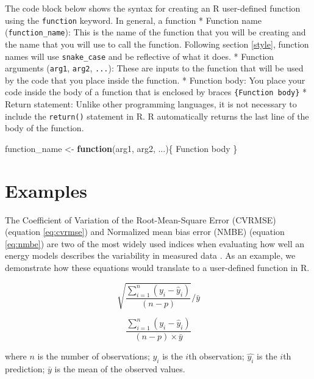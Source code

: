 \documentclass[
]{book}
\newenvironment{Shaded}{\begin{snugshade}}{\end{snugshade}}
\newcommand{\ControlFlowTok}[1]{\textcolor[rgb]{0.13,0.29,0.53}{\textbf{#1}}}
\newcommand{\NormalTok}[1]{#1}
\newcommand{\OtherTok}[1]{\textcolor[rgb]{0.56,0.35,0.01}{#1}}
\begin{document}
The code block below shows the syntax for creating an R user-defined function using the \texttt{function} keyword. In general, a function
* Function name (\texttt{function\_name}): This is the name of the function that you will be creating and the name that you will use to call the function. Following section \ref{style}, function names will use \texttt{snake\_case} and be reflective of what it does.
* Function arguments (\texttt{arg1}, \texttt{arg2}, \texttt{...}): These are inputs to the function that will be used by the code that you place inside the function.
* Function body: You place your code inside the body of a function that is enclosed by braces \texttt{\{Function\ body\}}
* Return statement: Unlike other programming languages, it is not necessary to include the \texttt{return()} statement in R. R automatically returns the last line of the body of the function.

\begin{Shaded}
\begin{Highlighting}[]
\NormalTok{function\_name }\OtherTok{\textless{}{-}} \ControlFlowTok{function}\NormalTok{(arg1, arg2, ...)\{}
\NormalTok{  Function body}
\NormalTok{\}}
\end{Highlighting}
\end{Shaded}

\hypertarget{examples}{%
\section{Examples}\label{examples}}

The Coefficient of Variation of the Root-Mean-Square Error (CVRMSE) (equation \eqref{eq:cvrmse}) and Normalized mean bias error (NMBE) (equation \eqref{eq:nmbe}) are two of the most widely used indices when evaluating how well an energy models describes the variability in measured data \citep{ashrae_ashrae_2014}. As an example, we demonstrate how these equations would translate to a user-defined function in R.

\begin{equation} 
  \sqrt{\frac{\sum_{i=1}^{n} \left(y_i - \hat{y}_i\right)}{(n-p)}} \Big/ \bar{y}
  \label{eq:cvrmse}
\end{equation}

\begin{equation} 
  \frac{\sum_{i=1}^{n} \left(y_i - \hat{y}_i\right)}{(n-p)\times\bar{y}}
  \label{eq:nmbe}
\end{equation}

where \(n\) is the number of observations; \(y_i\) is the \(i\)th observation; \(\hat{y_i}\) is the \(i\)th prediction; \(\bar{y}\) is the mean of the observed values.
\end{document}
